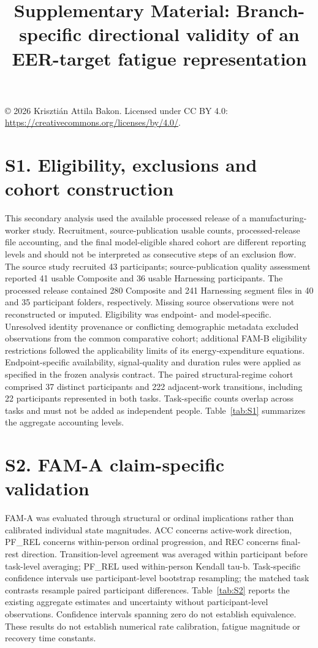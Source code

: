 \documentclass[10pt]{article}
\title{Supplementary Material: Branch-specific directional validity of an EER-target fatigue representation}
\author{}
\date{}
\begin{document}
\maketitle
\begin{center}\small \copyright{} 2026 Krisztián Attila Bakon. Licensed under CC BY 4.0: \url{https://creativecommons.org/licenses/by/4.0/}.\end{center}
\section*{S1. Eligibility, exclusions and cohort construction}
This secondary analysis used the available processed release of a manufacturing-worker study. Recruitment, source-publication usable counts, processed-release file accounting, and the final model-eligible shared cohort are different reporting levels and should not be interpreted as consecutive steps of an exclusion flow. The source study recruited 43 participants; source-publication quality assessment reported 41 usable Composite and 36 usable Harnessing participants. The processed release contained 280 Composite and 241 Harnessing segment files in 40 and 35 participant folders, respectively. Missing source observations were not reconstructed or imputed.
Eligibility was endpoint- and model-specific. Unresolved identity provenance or conflicting demographic metadata excluded observations from the common comparative cohort; additional FAM-B eligibility restrictions followed the applicability limits of its energy-expenditure equations. Endpoint-specific availability, signal-quality and duration rules were applied as specified in the frozen analysis contract. The paired structural-regime cohort comprised 37 distinct participants and 222 adjacent-work transitions, including 22 participants represented in both tasks. Task-specific counts overlap across tasks and must not be added as independent people. Table~\ref{tab:S1} summarizes the aggregate accounting levels.

\section*{S2. FAM-A claim-specific validation}
FAM-A was evaluated through structural or ordinal implications rather than calibrated individual state magnitudes. ACC concerns active-work direction, PF\_REL concerns within-person ordinal progression, and REC concerns final-rest direction. Transition-level agreement was averaged within participant before task-level averaging; PF\_REL used within-person Kendall tau-b. Task-specific confidence intervals use participant-level bootstrap resampling; the matched task contrasts resample paired participant differences. Table~\ref{tab:S2} reports the existing aggregate estimates and uncertainty without participant-level observations. Confidence intervals spanning zero do not establish equivalence. These results do not establish numerical rate calibration, fatigue magnitude or recovery time constants.

\end{document}
